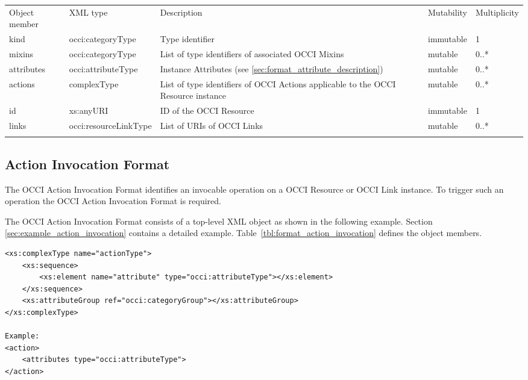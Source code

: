 \documentclass[10pt,a4paper]{article}
\begin{document}
 {
    \begin{tabularx}{\textwidth}{llXll}
    \toprule
    Object member & XML type & Description & Mutability & Multiplicity \\
    \colrule
    kind & occi:categoryType & Type identifier & immutable & 1 \\

    mixins & occi:categoryType & List of type identifiers of associated OCCI
Mixins  &
mutable & 0..* \\

    attributes & occi:attributeType & Instance Attributes (see
\ref{sec:format_attribute_description}) & mutable & 0..* \\
    
    actions & complexType & List of type identifiers of OCCI
Actions applicable to the OCCI Resource instance & mutable & 0..* \\
    
    id & xs:anyURI & ID of the OCCI Resource & immutable & 1\\
            
    links & occi:resourceLinkType & List of URIs of OCCI Links & mutable & 0..*\\
    \botrule
    \end{tabularx}
}

\subsection{Action Invocation Format}
\label{sec:format_action_invocation}

The OCCI Action Invocation  Format identifies an invocable operation on a OCCI Resource or
OCCI Link instance. To trigger such an operation the OCCI Action Invocation
Format is required.

The OCCI Action Invocation Format consists of a top-level XML object as shown in the
following example. Section \ref{sec:example_action_invocation} contains a detailed example.
Table~\ref{tbl:format_action_invocation} defines the object members.
\begin{lstlisting}
<xs:complexType name="actionType">
	<xs:sequence>
		<xs:element name="attribute" type="occi:attributeType"></xs:element>
	</xs:sequence>
	<xs:attributeGroup ref="occi:categoryGroup"></xs:attributeGroup>
</xs:complexType>

Example:
<action>
	<attributes type="occi:attributeType">
</action>
\end{lstlisting}
\end{document}
